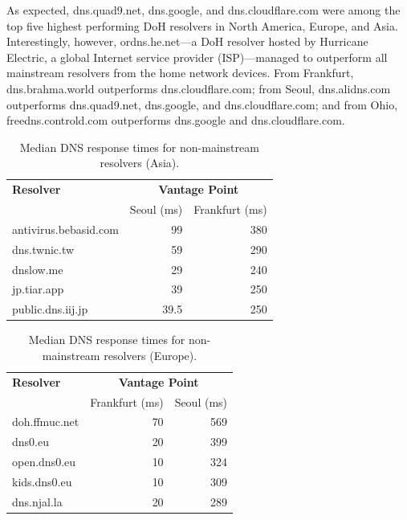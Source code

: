 As expected, dns.quad9.net, dns.google, and dns.cloudflare.com were among the top five highest performing DoH resolvers in North America, Europe, and Asia. Interestingly, however, ordns.he.net—a DoH resolver hosted by Hurricane Electric, a global Internet service provider (ISP)—managed to outperform all mainstream resolvers from the home network devices. From Frankfurt, dns.brahma.world outperforms dns.cloudflare.com; from Seoul, dns.alidns.com outperforms dns.quad9.net, dns.google, and dns.cloudflare.com; and from Ohio, freedns.controld.com outperforms dns.google and dns.cloudflare.com.

\begin{table}[t!]
\centering
\begin{tabular}{l|rr}
\toprule
    \textbf{Resolver} & \multicolumn{2}{c}{\textbf{Vantage Point}} \\
                  & \textrm{Seoul (ms)}         & \textrm{Frankfurt (ms)} \\
\midrule
antivirus.bebasid.com                                & 99 & 380                            \\
dns.twnic.tw                          & 59                                          & 290                              \\
dnslow.me                                & 29                                           & 240                              \\
jp.tiar.app                            & 39                                           & 250                             \\
public.dns.iij.jp                              & 39.5                                           & 250                               \\
\bottomrule
\end{tabular}
    \caption{Median DNS response times for non-mainstream resolvers (Asia).}
\label{tab:UnconvAsia}
\end{table}

\begin{table}[t!]
\centering
\begin{tabular}{l|rr}
\toprule
\textbf{Resolver} & \multicolumn{2}{c}{\textbf{Vantage Point}} \\
                  & \textrm{Frankfurt (ms)}     & \textrm{Seoul (ms)} \\
\midrule
doh.ffmuc.net                               & 70 & 569                         \\
dns0.eu                        & 20 & 399                         \\
open.dns0.eu         & 10 & 324                         \\
kids.dns0.eu                                 & 10 & 309                         \\
dns.njal.la                        & 20 & 289                         \\
\bottomrule
\end{tabular}
    \caption{Median DNS response times for non-mainstream resolvers (Europe).}
\label{tab:UnconvEur}
\end{table}


